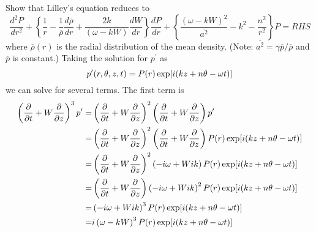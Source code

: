 \documentclass[onecolumn,10pt]{jhwhw}
\begin{document}
Show that Lilley’s equation reduces to
$$
\dfrac{d^2 P}{dr^2} + \left \{ \dfrac{1}{r} - \dfrac{1}{\overline{\rho}} \dfrac{d \overline{\rho}}{dr} + \dfrac{2k}{(\omega-kW)}  \dfrac{dW}{dr} \right \} \dfrac{dP}{dr} + \left \{ \dfrac{(\omega-kW)^2}{\overline{a^2}} -k^2-\dfrac{n^2}{r^2} \right \} P = RHS
$$
where $\overline{\rho}(r)$ is the radial distribution of the mean density. (Note: $\overline{a^2} = \gamma \overline{p}/\overline{\rho}$ and $\overline{p}$ is constant.)
\solution
Taking the solution for $p^{\prime}$ as
$$
p^{\prime} (r,\theta,z,t) = P(r) \exp[i(kz+n \theta - \omega t)]
$$
we can solve for several terms. The first term is
\begin{align*}
\left ( \dfrac{\partial}{\partial t} + W \dfrac{\partial}{\partial z} \right)^3 p^{\prime} =&
\left ( \dfrac{\partial}{\partial t} + W \dfrac{\partial}{\partial z} \right)^2 \left ( \dfrac{\partial}{\partial t} + W \dfrac{\partial}{\partial z} \right) p^{\prime} \\
=& \left ( \dfrac{\partial}{\partial t} + W \dfrac{\partial}{\partial z} \right)^2 \left ( \dfrac{\partial}{\partial t} + W \dfrac{\partial}{\partial z} \right) P(r) \exp[i(kz+n \theta - \omega t)] \\
=& \left ( \dfrac{\partial}{\partial t} + W \dfrac{\partial}{\partial z} \right)^2 \left ( -i \omega + W ik \right) P(r) \exp[i(kz+n \theta - \omega t)] \\
=& \left ( \dfrac{\partial}{\partial t} + W \dfrac{\partial}{\partial z} \right) \left ( -i \omega + W ik \right)^2 P(r) \exp[i(kz+n \theta - \omega t)] \\
=& \left ( -i \omega + W ik \right)^3 P(r) \exp[i(kz+n \theta - \omega t)] \\
=& i \left ( \omega-k W \right)^3 P(r) \exp[i(kz+n \theta - \omega t)]
\end{align*}
\end{document}

